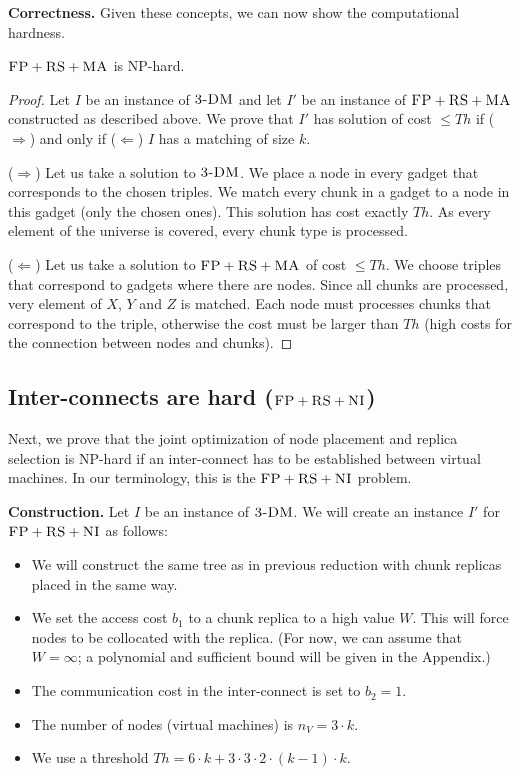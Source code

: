 \documentclass[9pt]{sigcomm-alternate}
\newcommand{\CC}{\textsc{NI}}
\newcommand{\FP}{\textsc{FP}}
\newcommand{\RS}{\textsc{RS}}
\newcommand{\MA}{\textsc{MA}}
\newcommand{\CostTrans}{\ensuremath{b_1}}
\newcommand{\CostCom}{\ensuremath{b_2}}
\newcommand{\Vms}{\ensuremath{n_V}}
\newcommand{\TDM}{\textsc{3-DM}}
\newcommand{\Thr}{\ensuremath{Th}}
\begin{document}
\textbf{Correctness.}
Given these concepts, we can now show the computational hardness.
\begin{theorem}
$\FP+\RS+\MA$ is NP-hard.
\end{theorem}
\begin{proof}
Let $I$ be an instance of $\TDM$ and let $I'$ be an instance of
$\FP+\RS+\MA$ constructed as described above.
We prove that $I'$ has solution of cost $\leq \Thr$ if ($\Rightarrow$) and only if
($\Leftarrow$)
$I$ has a matching of size $k$.

($\Rightarrow$) Let us take a solution to $\TDM$. We place a node in every
gadget that corresponds to the chosen triples. We match every chunk in a
gadget to a node in this gadget (only the chosen ones). This solution has
cost exactly $\Thr$. As every element of the universe is covered, every
chunk type is processed.

($\Leftarrow$) Let us take a solution to $\FP+\RS+\MA$ of cost $\leq \Thr$. We
choose triples that correspond to gadgets where there are nodes. Since
all chunks are processed, very element of $X$, $Y$ and $Z$ is matched. Each
node must processes chunks that correspond to the triple, otherwise the
cost must be larger than $\Thr$ (high costs for the connection between
nodes and chunks).
\end{proof}


\subsection{Inter-connects are hard ($\FP+\RS+\CC$)}\label{ssec:fprscc}

Next, we prove that the joint optimization of node placement and replica selection
is NP-hard if an inter-connect has to be established between virtual machines.
In our terminology, this is the $\FP+\RS+\CC$ problem.

\textbf{Construction.}
Let $I$ be an instance of $\TDM$. We will create an instance $I'$
for $\FP+\RS+\CC$ as follows:
\begin{itemize}
\item We will construct the same tree as in previous reduction with
chunk replicas placed in the same way.
\item We set the access cost $\CostTrans$ to a chunk replica to a high value $W$. This will force
nodes to be collocated with the replica.
(For now, we can assume that $W=\infty$; a polynomial and sufficient bound will be given
in the Appendix.)
\item The communication cost in the inter-connect is set to $\CostCom = 1$.
\item The number of nodes (virtual machines) is $\Vms = 3 \cdot k$.
\item We use a threshold $\Thr =  6 \cdot k + 3 \cdot 3 \cdot 2 \cdot
(k - 1) \cdot k$.
\end{itemize}
\end{document}
